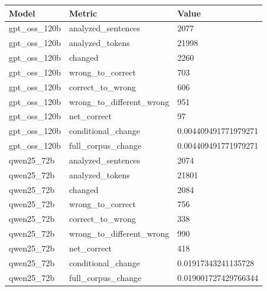 \begin{tabular}{lll}
\hline
Model & Metric & Value \\
\hline
gpt\_oss\_120b & analyzed\_sentences & 2077 \\
gpt\_oss\_120b & analyzed\_tokens & 21998 \\
gpt\_oss\_120b & changed & 2260 \\
gpt\_oss\_120b & wrong\_to\_correct & 703 \\
gpt\_oss\_120b & correct\_to\_wrong & 606 \\
gpt\_oss\_120b & wrong\_to\_different\_wrong & 951 \\
gpt\_oss\_120b & net\_correct & 97 \\
gpt\_oss\_120b & conditional\_change & 0.004409491771979271 \\
gpt\_oss\_120b & full\_corpus\_change & 0.004409491771979271 \\
qwen25\_72b & analyzed\_sentences & 2074 \\
qwen25\_72b & analyzed\_tokens & 21801 \\
qwen25\_72b & changed & 2084 \\
qwen25\_72b & wrong\_to\_correct & 756 \\
qwen25\_72b & correct\_to\_wrong & 338 \\
qwen25\_72b & wrong\_to\_different\_wrong & 990 \\
qwen25\_72b & net\_correct & 418 \\
qwen25\_72b & conditional\_change & 0.01917343241135728 \\
qwen25\_72b & full\_corpus\_change & 0.019001727429766344 \\
\hline
\end{tabular}
